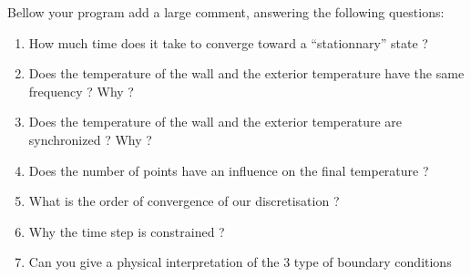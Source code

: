 \documentclass[a4paper,10pt]{article}
\begin{document}
Bellow your program add a large comment, answering the following questions:
\begin{enumerate}
\item How much time does it take to converge toward a ``stationnary'' state ?
\item Does the temperature of the wall and the exterior temperature have the same frequency ? Why ?
\item Does the temperature of the wall and the exterior temperature are synchronized ? Why ?\\
\item Does the number of points have an influence on the final temperature ?
\item What is the order of convergence of our discretisation ?
\item Why the time step is constrained ?\\
\item Can you give a physical interpretation of the 3 type of boundary conditions\\~\\
\end{enumerate}
%
\end{document}
